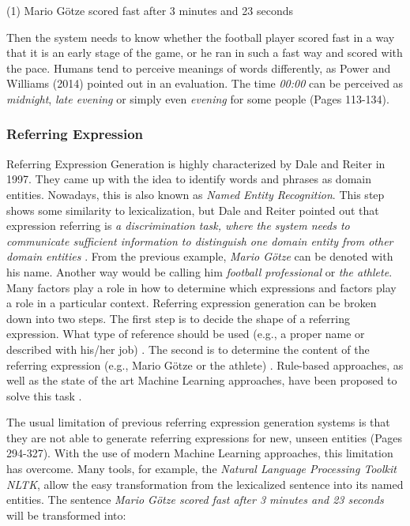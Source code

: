 \begin{tcolorbox}
	\begin{center}
		(1) Mario Götze scored fast after 3 minutes and 23 seconds
	\end{center}
\end{tcolorbox}

Then the system needs to know whether the football player scored fast in a way that it is an early stage of the game, or he ran in such a fast way and scored with the pace. Humans tend to perceive meanings of words differently, as Power and Williams (2014) pointed out in an evaluation. The time \textit{00:00} can be perceived as \textit{midnight}, \textit{late evening} or simply even \textit{evening} for some people \cite{Power} (Pages 113-134).


\subsubsection{Referring Expression}\label{ss:ref}

Referring Expression Generation is highly characterized by Dale and Reiter in 1997. They came up with the idea to identify words and phrases as domain entities. Nowadays, this is also known as \textit{Named Entity Recognition}. This step shows some similarity to lexicalization, but Dale and Reiter pointed out that expression referring is \textit{a discrimination task, where the system needs to communicate sufficient information to distinguish one domain entity from other domain entities} \cite{reiter2}. From the previous example, \textit{Mario Götze} can be denoted with his name. Another way would be calling him \textit{football professional} or \textit{the athlete}. Many factors play a role in how to determine which expressions and factors play a role in a particular context. Referring expression generation can be broken down into two steps.
The first step is to decide the shape of a referring expression. What type of reference should be used (e.g., a proper name or described with his/her job) \cite{named}. The second is to determine the content of the referring expression (e.g., Mario Götze or the athlete) \cite{named}.
Rule-based approaches, as well as the state of the art Machine Learning approaches, have been proposed to solve this task \cite{reiter2}.  

The usual limitation of previous referring expression generation systems is that they are not able to generate referring expressions for new, unseen entities \cite{anja} (Pages 294-327). With the use of modern Machine Learning approaches, this limitation has overcome.
Many tools, for example, the \textit{Natural Language Processing Toolkit NLTK}, allow the easy transformation from the lexicalized sentence into its named entities. The sentence \textit{Mario Götze scored fast after 3 minutes and 23 seconds} will be transformed into:

